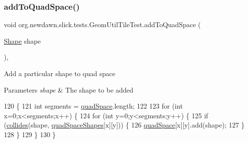 \subsubsection{\texorpdfstring{add\+To\+Quad\+Space()}{addToQuadSpace()}}
{\footnotesize\ttfamily void org.\+newdawn.\+slick.\+tests.\+Geom\+Util\+Tile\+Test.\+add\+To\+Quad\+Space (\begin{DoxyParamCaption}\item[{\mbox{\hyperlink{classorg_1_1newdawn_1_1slick_1_1geom_1_1_shape}{Shape}}}]{shape }\end{DoxyParamCaption})\hspace{0.3cm}{\ttfamily [inline]}, {\ttfamily [private]}}

Add a particular shape to quad space


\begin{DoxyParams}{Parameters}
{\em shape} & The shape to be added \\
\hline
\end{DoxyParams}

\begin{DoxyCode}
120                                              \{
121         \textcolor{keywordtype}{int} segments = \mbox{\hyperlink{classorg_1_1newdawn_1_1slick_1_1tests_1_1_geom_util_tile_test_a669ad26af6e1635deb8855d2df3788bb}{quadSpace}}.length;
122         
123         \textcolor{keywordflow}{for} (\textcolor{keywordtype}{int} x=0;x<segments;x++) \{
124             \textcolor{keywordflow}{for} (\textcolor{keywordtype}{int} y=0;y<segments;y++) \{
125                 \textcolor{keywordflow}{if} (\mbox{\hyperlink{classorg_1_1newdawn_1_1slick_1_1tests_1_1_geom_util_tile_test_acc2015685ff9204e107a3bfff49459fb}{collides}}(shape, \mbox{\hyperlink{classorg_1_1newdawn_1_1slick_1_1tests_1_1_geom_util_tile_test_ac0451795d8b1fc03cbd0c348e32e86c8}{quadSpaceShapes}}[x][y])) \{
126                     \mbox{\hyperlink{classorg_1_1newdawn_1_1slick_1_1tests_1_1_geom_util_tile_test_a669ad26af6e1635deb8855d2df3788bb}{quadSpace}}[x][y].add(shape);
127                 \}
128             \}
129         \}
130     \}
\end{DoxyCode}
\mbox{\label{classorg_1_1newdawn_1_1slick_1_1tests_1_1_geom_util_tile_test_acc2015685ff9204e107a3bfff49459fb}} 
